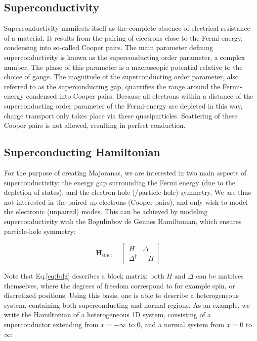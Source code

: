     \subsection{Superconductivity}
        Superconductivity manifests itself as the complete absence of electrical resistance of a material.
        It results from the pairing of electrons close to the Fermi-energy, condensing into so-called Cooper pairs.
        The main parameter defining superconductivity is known as the superconducting order parameter, a complex number.
        The phase of this parameter is a macroscopic potential relative to the choice of gauge.
        The magnitude of the superconducting order parameter, also referred to as the superconducting gap, quantifies the range around the Fermi-energy condensed into Cooper pairs.
        Because all electrons within a distance of the superconducting order parameter of the Fermi-energy are depleted in this way, charge transport only takes place via these quasiparticles.
        Scattering of these Cooper pairs is not allowed, resulting in perfect conduction.

    \subsection{Superconducting Hamiltonian}
        For the purpose of creating Majoranas, we are interested in two main aspects of superconductivity: the energy gap surrounding the Fermi energy (due to the depletion of states), and the electron-hole (/particle-hole) symmetry.
        We are thus not interested in the paired up electrons (Cooper pairs), and only wish to model the electronic (unpaired) modes.
        This can be achieved by modeling superconductivity with the Boguliubov de Gennes Hamiltonian, which ensures particle-hole symmetry:
        
        \begin{equation}
        \mathbf{H}_\text{BdG} = \begin{bmatrix} H & \Delta \\ \Delta^\dagger & -H \end{bmatrix}
        \label{eq:bdg}
        \end{equation}

        Note that Eq.\eqref{eq:bdg} describes a block matrix: both $H$ and $\Delta$ can be matrices themselves, where the degrees of freedom correspond to for example spin, or discretized positions.
        Using this basis, one is able to describe a heterogeneous system, containing both superconducting and normal regions.
        As an example, we write the Hamiltonian of a heterogeneous 1D system, consisting of a superconductor extending from $x = -\infty$ to $0$, and a normal system from  $x = 0$ to $\infty$:

